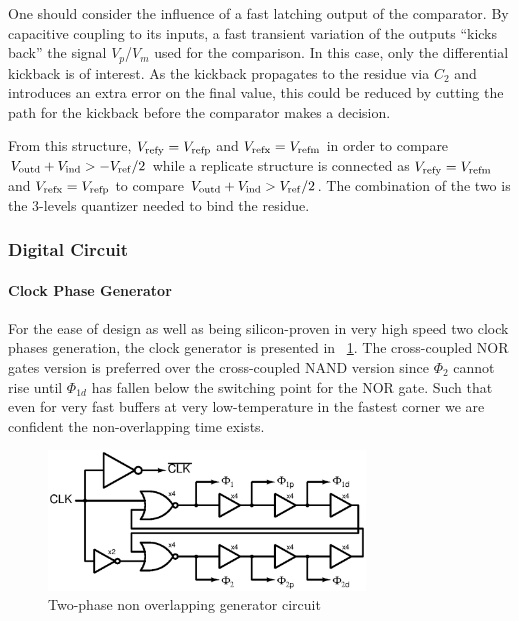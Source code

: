 One should consider the influence of a fast latching output of the comparator. By capacitive coupling to its inputs, a fast transient variation of the outputs ``kicks back'' the signal \(V_p\)/\(V_m\) used for the comparison. In this case, only the differential kickback is of interest. As the kickback propagates to the residue via \(C_2\) and introduces an extra error on the final value, this could be reduced by cutting the path for the kickback before the comparator makes a decision.

From this structure, \(V_{\rm refy} = V_{\rm refp}\) and \(V_{\rm refx} = V_{\rm refm}\) in order to compare \(V_{\rm outd}+V_{\rm ind} > - V_{\rm ref}/2\) while a replicate structure is connected as \(V_{\rm refy} = V_{\rm refm}\) and \(V_{\rm refx} = V_{\rm refp}\) to compare \(V_{\rm outd}+V_{\rm ind} > V_{\rm ref}/2\). The combination of the two is the 3-levels quantizer needed to bind the residue.

	\subsubsection{Digital Circuit}         %
\paragraph{Clock Phase Generator}   %

For the ease of design as well as being silicon-proven in very high speed two clock phases generation, the clock generator is presented in \figurename~\ref{fig:non-ov}. The cross-coupled NOR gates version is preferred over the cross-coupled NAND version since \(\Phi_2 \) cannot rise until \(\Phi_{1d} \) has fallen below
the switching point for the NOR gate. Such that even for very fast buffers at very low-temperature in the fastest corner we are confident the non-overlapping time exists.

\begin{figure}[htp]
	\centering
	\includegraphics[width=0.75\textwidth]{Chapter4/Figs/non-overlapp.ps}
	\caption{Two-phase non overlapping generator circuit}
	\label{fig:non-ov}
\end{figure}

